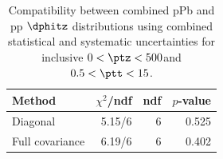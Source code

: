\begin{table}[htp!]
\centering
\begin{tabular}{|l|r|r|r|}
\hline
Method & $\chi^2$/ndf & ndf & $p$-value \\
\hline
Diagonal & 5.15/6 & 6 & 0.525 \\
Full covariance & 6.19/6 & 6 & 0.402 \\
\hline
\end{tabular}
\caption{Compatibility between combined pPb and pp $\dphitz$ distributions using combined statistical and systematic uncertainties for inclusive $0 < \ptz < 500$\GeV and $0.5 < \ptt < 15$\GeV.}
\label{table:chisq_dphi}
\end{table}
